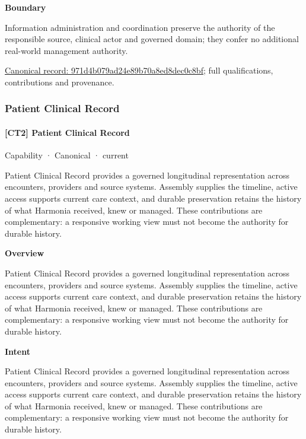 \textbf{Boundary}



Information administration and coordination preserve the authority of the responsible source, clinical actor and governed domain; they confer no additional real-world management authority.


{\footnotesize \href{../../../../continuum/strategy/capability/971d4b079ad24e89b70a8ed8dec0c8bf.md}{Canonical record: 971d4b079ad24e89b70a8ed8dec0c8bf}; full qualifications, contributions and provenance.}\par
\subsubsection{Patient Clinical Record}

\paragraph{[CT2] Patient Clinical Record}

\label{element:5478878e0e6e4d34a8d5023ac6ac2d54}
{\small Capability · Canonical · current}\par

Patient Clinical Record provides a governed longitudinal representation across encounters, providers and source systems. Assembly supplies the timeline, active access supports current care context, and durable preservation retains the history of what Harmonia received, knew or managed. These contributions are complementary: a responsive working view must not become the authority for durable history.



\textbf{Overview}



Patient Clinical Record provides a governed longitudinal representation across encounters, providers and source systems. Assembly supplies the timeline, active access supports current care context, and durable preservation retains the history of what Harmonia received, knew or managed. These contributions are complementary: a responsive working view must not become the authority for durable history.



\textbf{Intent}



Patient Clinical Record provides a governed longitudinal representation across encounters, providers and source systems. Assembly supplies the timeline, active access supports current care context, and durable preservation retains the history of what Harmonia received, knew or managed. These contributions are complementary: a responsive working view must not become the authority for durable history.



